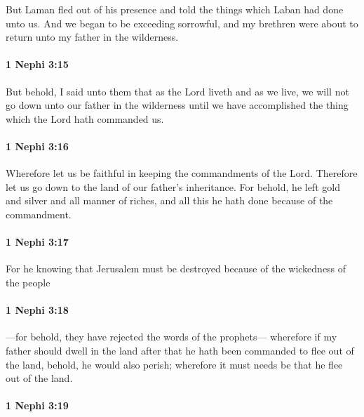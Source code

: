 			But Laman fled out of his presence
			and told the things which Laban had done
			unto us.
			And we began to be exceeding sorrowful,
			and my brethren were about to return unto my father in the wilderness.

		\paragraph{1 Nephi 3:15} %
			\label{1NEPHI-3-15}

			But behold, I said unto them that
			as the Lord liveth and as we live,
			we will not go down unto our father in the wilderness
			until we have accomplished the thing which the Lord hath commanded us.

		\paragraph{1 Nephi 3:16} %
			\label{1NEPHI-3-16}

			Wherefore let us be faithful in keeping the commandments of the Lord.
			Therefore let us go down to the land of our father’s inheritance.
			For behold, he left gold and silver and all manner of riches,
			and all this he hath done because of the commandment.

		\paragraph{1 Nephi 3:17} %
			\label{1NEPHI-3-17}

			For he knowing that Jerusalem must be destroyed
			because of the wickedness of the people

		\paragraph{1 Nephi 3:18} %
			\label{1NEPHI-3-18}

			---for behold, they have rejected the words of the prophets---
			wherefore if my father should dwell in the land
			after that he hath been commanded to flee out of the land,
			behold, he would also perish;
			wherefore it must needs be that he flee out of the land.

		\paragraph{1 Nephi 3:19} %
			\label{1NEPHI-3-19}

